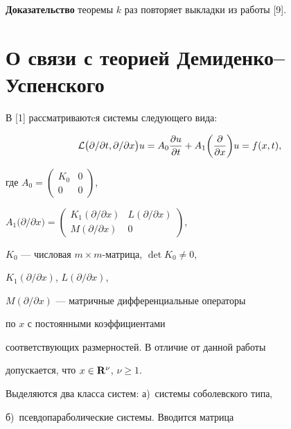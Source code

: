 {\bf Доказательство} теоремы $k$ раз повторяет выкладки из работы [9].








\section{О связи с теорией Демиденко--Успенского}





В [1] рассматриваютcя системы следующего вида:


\begin{equation}


{\cal L}\big (\partial /\partial t,\partial /\partial x\big )u=


A_0\frac{\partial u}{\partial{t}}+A_1\bigg (\frac{\partial}{\partial{x}}


\bigg )u=f(x,t),


\end{equation}


где $A_0=\left(\begin{smallmatrix}K_0 & 0 \\ 0 & 0\end{smallmatrix}\right)$,


$A_1\big (\partial /\partial x\big )=\left(


\begin{smallmatrix}


K_1(\partial/\partial x) & L(\partial/\partial x) \\


M(\partial/\partial x) & 0


\end{smallmatrix}\right)$,


$K_0$ --- числовая $m\times m$-матрица, $\det K_0\ne0$,


$K_1(\partial/\partial x)$, $L(\partial/\partial x)$,


$M(\partial/\partial x)$ --- матричные дифференциальные операторы


по $x$ с постоянными коэффициентами


соответствующих размерностей. В отличие от данной работы


допускается, что $x\in {\bold R}^{\nu }$, $\nu\geq 1$.


Выделяются два класса систем: а)~системы соболевского типа,


б)~псевдопараболические системы. Вводится матрица


